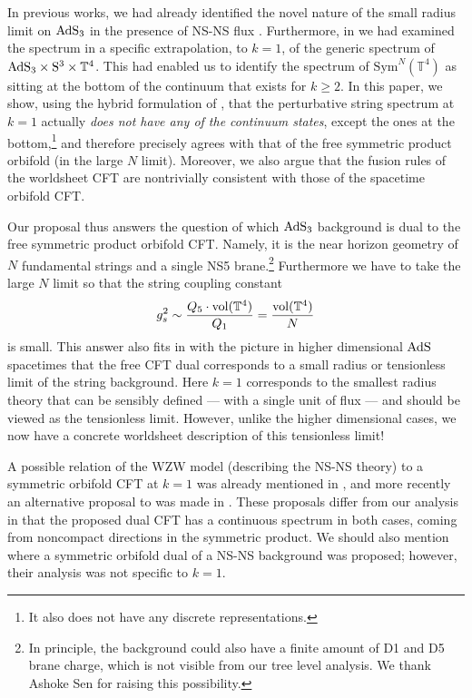 \documentclass[12pt,a4paper]{article}
\newcommand{\be}{\begin{equation}}
\newcommand{\ee}{\end{equation}}
\begin{document}
In previous works, we had already identified the novel 
nature of the small radius limit on ${\rm AdS}_3$ in the presence of NS-NS flux \cite{Gaberdiel:2017oqg, Ferreira:2017pgt}. Furthermore, in \cite{Gaberdiel:2018rqv} we had examined the spectrum  in a specific extrapolation, to $k=1$, of the generic spectrum of ${\rm AdS}_3\times {\rm S}^3\times \mathbb{T}^4$. This had enabled us to identify the spectrum of $\mathrm{Sym}^N(\mathbb{T}^4)$ as sitting at the bottom of the continuum that exists for $k \geq 2$. In this paper, we show, using the hybrid formulation of \cite{Berkovits:1999im}, that the perturbative string spectrum at $k=1$ actually {\it does not have any of the continuum states}, except the ones at the bottom,\footnote{It also does not have any discrete representations.} and therefore precisely agrees with that of the free symmetric product orbifold (in the large $N$ limit). Moreover, we also argue that the fusion rules of the worldsheet CFT are nontrivially consistent with those of the spacetime orbifold CFT. 

Our proposal thus answers the question of which ${\rm AdS}_3$ background is dual to the free symmetric product orbifold CFT. Namely, it is the near horizon geometry of $N$ fundamental strings and a single NS5 brane.\footnote{In principle, the background could also have a finite amount of D1 and D5 brane charge, which is not visible from our tree level analysis. We thank Ashoke Sen for raising this possibility.} Furthermore we have to take the large $N$ limit so that the string coupling constant 
\be
g_s^2 \sim \frac{Q_5 \cdot {\rm vol}(\mathbb{T}^4)}{Q_1} =  \frac{{\rm vol}(\mathbb{T}^4)}{N}
\ee
is small. This answer also fits in with the picture in higher dimensional ${\rm AdS}$ spacetimes that the free CFT dual corresponds to a small radius or tensionless limit of the string background. Here $k=1$ corresponds to the smallest radius theory that can be sensibly defined --- with a single unit of flux --- and should be viewed as the tensionless limit. However, unlike the higher dimensional cases, we now have a concrete worldsheet description of this tensionless limit! 

A possible relation of the WZW model (describing the NS-NS theory) to a symmetric orbifold CFT at $k=1$ was already mentioned in \cite{Seiberg:1999xz}, and more recently an alternative proposal to \cite{Gaberdiel:2018rqv} was made in \cite{Giribet:2018ada}. These proposals differ from our analysis in that the proposed dual CFT has a continuous spectrum in both cases, coming from noncompact directions in the symmetric product. We should also mention \cite{Argurio:2000tb} where a symmetric orbifold dual of a NS-NS background was proposed; however, their analysis was not specific to $k=1$. 
\end{document}
